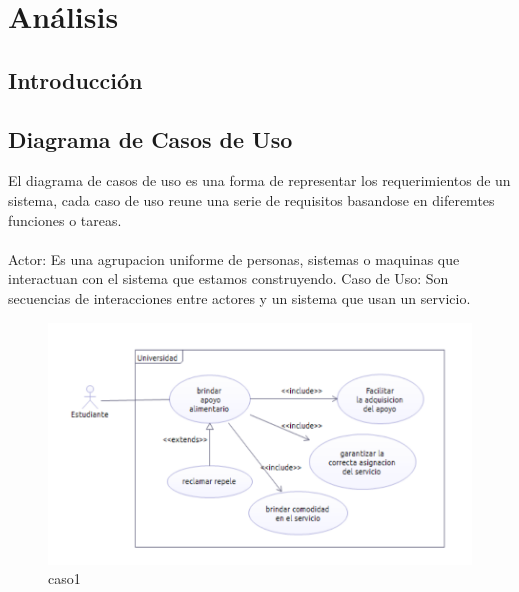 \chapter{Análisis}

\section{Introducción}


\section{Diagrama de Casos de Uso}
El diagrama de casos de uso es una forma de representar los requerimientos de un sistema, cada caso de uso reune una serie de requisitos basandose en diferemtes funciones o tareas.
\\
\\
Actor: Es una agrupacion uniforme de personas, sistemas o maquinas que interactuan con el sistema que estamos construyendo.   
Caso de Uso: Son secuencias de interacciones entre actores y un sistema que usan un servicio. 

\begin{figure}[th!]
	\centering
	\includegraphics[width=0.8\linewidth]{uml/caso1}
	\caption{caso1}
	\label{fig:caso1}
\end{figure}

